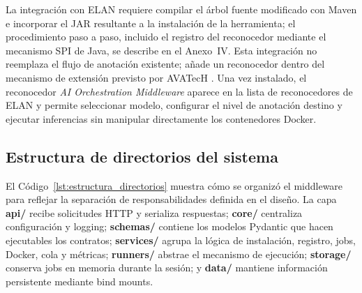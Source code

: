 La integración con ELAN requiere compilar el árbol fuente modificado con Maven e incorporar el JAR resultante a la instalación de la herramienta; el procedimiento paso a paso, incluido el registro del reconocedor mediante el mecanismo SPI de Java, se describe en el Anexo~IV. Esta integración no reemplaza el flujo de anotación existente; añade un reconocedor dentro del mecanismo de extensión previsto por AVATecH \cite{auer2014avatech}. Una vez instalado, el reconocedor \textit{AI Orchestration Middleware} aparece en la lista de reconocedores de ELAN y permite seleccionar modelo, configurar el nivel de anotación destino y ejecutar inferencias sin manipular directamente los contenedores Docker.

\vspace{1\baselineskip}

\subsection{Estructura de directorios del sistema}

El Código~\ref{lst:estructura_directorios} muestra cómo se organizó el middleware para reflejar la separación de responsabilidades definida en el diseño. La capa \textbf{api/} recibe solicitudes HTTP y serializa respuestas; \textbf{core/} centraliza configuración y logging; \textbf{schemas/} contiene los modelos Pydantic que hacen ejecutables los contratos; \textbf{services/} agrupa la lógica de instalación, registro, jobs, Docker, cola y métricas; \textbf{runners/} abstrae el mecanismo de ejecución; \textbf{storage/} conserva jobs en memoria durante la sesión; y \textbf{data/} mantiene información persistente mediante bind mounts.

